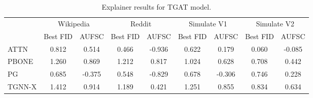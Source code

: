 \begin{table}
\centering
\begin{tabular}{lcccccccc}
\toprule
 & \multicolumn{2}{c}{Wikipedia} & \multicolumn{2}{c}{Reddit} & \multicolumn{2}{c}{Simulate V1} & \multicolumn{2}{c}{Simulate V2} \\
 & Best FID & AUFSC & Best FID & AUFSC & Best FID & AUFSC & Best FID & AUFSC \\
\midrule
ATTN & 0.812 & 0.514 & 0.466 & -0.936 & 0.622 & 0.179 & 0.060 & -0.085 \\
PBONE & 1.260 & 0.869 & 1.212 & 0.817 & 1.024 & 0.628 & 0.708 & 0.442 \\
PG & 0.685 & -0.375 & 0.548 & -0.829 & 0.678 & -0.306 & 0.746 & 0.228 \\
TGNN-X & 1.412 & 0.914 & 1.189 & 0.421 & 1.251 & 0.855 & 0.834 & 0.634 \\
\bottomrule
\end{tabular}
\caption{\label{tab:tgat_results}Explainer results for TGAT model.}
\end{table}
